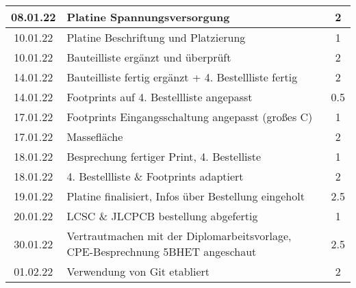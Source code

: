 \begin{longtable}{c|p{10cm}|c}
    08.01.22       & Platine Spannungsversorgung                                                                            & 2                     \\ \hline
    10.01.22       & Platine Beschriftung und Platzierung                                                                   & 1                     \\ \hline
    10.01.22       & Bauteilliste ergänzt und überprüft                                                                     & 2                     \\ \hline
    14.01.22       & Bauteilliste fertig ergänzt + 4. Bestellliste fertig                                                   & 2                     \\ \hline
    14.01.22       & Footprints auf 4. Bestellliste angepasst                                                               & 0.5                   \\ \hline
    17.01.22       & Footprints Eingangsschaltung angepasst (großes C)                                                      & 1                     \\ \hline
    17.01.22       & Massefläche                                                                                            & 2                     \\ \hline
    18.01.22       & Besprechung fertiger Print, 4. Bestelliste                                                             & 1                     \\ \hline
    18.01.22       & 4. Bestellliste \& Footprints adaptiert                                                                & 2                     \\ \hline
    19.01.22       & Platine finalisiert, Infos über Bestellung eingeholt                                                   & 2.5                   \\ \hline
    20.01.22       & LCSC \& JLCPCB bestellung abgefertig                                                                   & 1                     \\ \hline
    30.01.22       & Vertrautmachen mit der Diplomarbeitsvorlage, \newline CPE-Besprechnung   5BHET angeschaut                       & 2.5                   \\ \hline
    01.02.22       & Verwendung von Git etabliert                                                                           & 2                     \\ \hline

\end{longtable}
